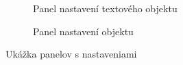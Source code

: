 \begin{figure}
\begin{subfigure}[t]{0.48\linewidth}
		\caption{Panel nastavení textového objektu}
	\end{subfigure}
	\quad
	\begin{subfigure}[t]{0.48\linewidth}	
		\caption{Panel nastavení objektu}
	\end{subfigure}
	\caption{Ukážka panelov s nastaveniami}
\end{figure}

